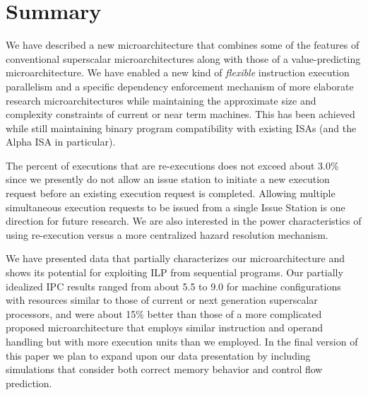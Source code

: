 \documentclass[10pt,dvips]{article}
\begin{document}
\section{Summary}
%
We have described a new microarchitecture that combines
some of the features of conventional superscalar microarchitectures
along with those of a value-predicting microarchitecture.
We have enabled a new kind of
{\em flexible} instruction execution parallelism
and a specific dependency enforcement mechanism
of more elaborate research microarchitectures while maintaining
the approximate size and complexity constraints of current or near term
machines.
This has been achieved while still maintaining binary program
compatibility with
existing ISAs (and the Alpha ISA in particular).

The percent of executions that are re-executions does not
exceed about 3.0\% since we presently do not allow
an issue station to initiate a new execution request
before an existing execution request is completed.
Allowing multiple simultaneous execution requests
to be issued
from a single Issue Station is one direction for
future research.  We are also interested in the power characteristics
of using re-execution versus a more centralized hazard resolution
mechanism.

We have presented data that partially characterizes our
microarchitecture and shows its potential for exploiting
ILP from sequential programs.  
Our partially idealized IPC results ranged from about 5.5 to 9.0 for
machine configurations with resources similar to those of
current or next generation superscalar processors,
and were about 15\% better than those of a
more complicated proposed microarchitecture that employs similar
instruction and operand handling but with more execution units
than we employed.
In the final version of this
paper we plan to expand upon our data presentation by including
simulations that consider both correct memory behavior and
control flow prediction.
%


%
\end{document}
